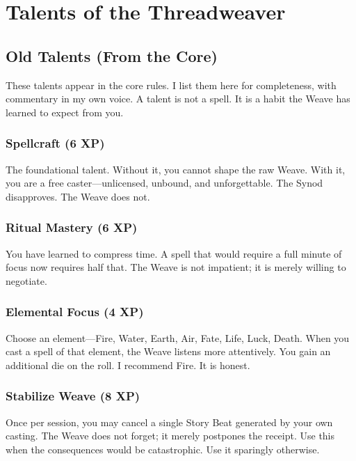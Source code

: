 \chapter{Talents of the Threadweaver}

\section{Old Talents (From the Core)}

These talents appear in the core rules. I list them here for completeness, with commentary in my own voice. A talent is not a spell. It is a habit the Weave has learned to expect from you.

\subsection{Spellcraft (6 XP)}

The foundational talent. Without it, you cannot shape the raw Weave. With it, you are a free caster---unlicensed, unbound, and unforgettable. The Synod disapproves. The Weave does not.

\subsection{Ritual Mastery (6 XP)}

You have learned to compress time. A spell that would require a full minute of focus now requires half that. The Weave is not impatient; it is merely willing to negotiate.

\subsection{Elemental Focus (4 XP)}

Choose an element---Fire, Water, Earth, Air, Fate, Life, Luck, Death. When you cast a spell of that element, the Weave listens more attentively. You gain an additional die on the roll. I recommend Fire. It is honest.

\subsection{Stabilize Weave (8 XP)}

Once per session, you may cancel a single Story Beat generated by your own casting. The Weave does not forget; it merely postpones the receipt. Use this when the consequences would be catastrophic. Use it sparingly otherwise.

